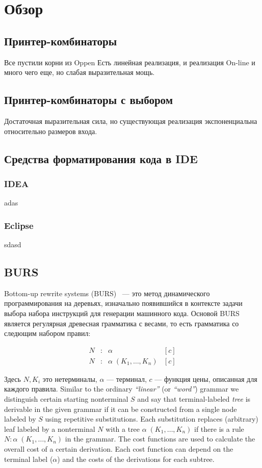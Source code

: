 \section{Обзор}

\subsection{Принтер-комбинаторы}
Все пустили корни из Oppen
Есть линейная реализация, и реализация On-line и много чего еще, но слабая выразительная мощь.

\subsection{Принтер-комбинаторы с выбором}
Достаточная выразительная сила, но существующая реализация экспоненциальна
относительно размеров входа.

\subsection{Средства форматирования кода в IDE}

\subsubsection{IDEA}
adas
\subsubsection{Eclipse}
sdasd

\subsection{BURS}
Bottom-up rewrite systems (BURS)~\cite{burs} --- это метод динамического
программирования на деревьях, изначально появившийся в контексте задачи выбора
набора инструкций для генерации машинного кода. Основой BURS является
регулярная древесная грамматика с весами, то есть грамматика со следющим
набором правил: 

$$
\begin{array}{rcll}
  N &:& \alpha& [c]\\
  N &:& \alpha\; (K_1,\dots,K_n)& [c]
\end{array}
$$

Здесь $N, K_i$ это нетерминалы, $\alpha$ --- терминал,
$c$ --- функция цены, описанная для каждого правила.
Similar to the ordinary \emph{``linear''} (or \emph{``word''}) grammar we distinguish certain starting 
nonterminal $S$ 
and say that terminal-labeled \emph{tree} is derivable in the given grammar if it can be constructed from 
a single node labeled by $S$ using repetitive substitutions. Each substitution replaces (arbitrary) leaf 
labeled by a nonterminal $N$ with a tree $\alpha\;(K_1,\dots,K_n)$ if there is a rule 
$N:\alpha\;(K_1,\dots,K_n)$ in the grammar. The cost functions are used to calculate the overall cost 
of a certain derivation. Each cost function can depend on the terminal label ($\alpha$) and the costs 
of the derivations for each subtree.

